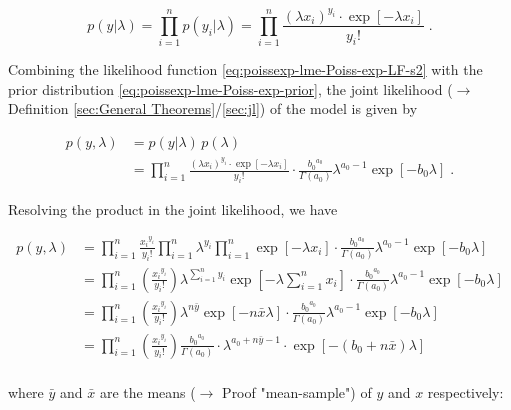 \documentclass[a4paper,12pt,twoside]{book}
\begin{document}
\begin{equation} \label{eq:poissexp-lme-Poiss-exp-LF-s2}
p(y|\lambda) = \prod_{i=1}^n p(y_i|\lambda) = \prod_{i=1}^n \frac{(\lambda x_i)^{y_i} \cdot \exp\left[-\lambda x_i\right]}{y_i !} \; .
\end{equation}

Combining the likelihood function \eqref{eq:poissexp-lme-Poiss-exp-LF-s2} with the prior distribution \eqref{eq:poissexp-lme-Poiss-exp-prior}, the joint likelihood ($\rightarrow$ Definition \ref{sec:General Theorems}/\ref{sec:jl}) of the model is given by

\begin{equation} \label{eq:poissexp-lme-Poiss-exp-JL-s1}
\begin{split}
p(y,\lambda) &= p(y|\lambda) \, p(\lambda) \\
&= \prod_{i=1}^n \frac{(\lambda x_i)^{y_i} \cdot \exp\left[-\lambda x_i\right]}{y_i !} \cdot \frac{ {b_0}^{a_0}}{\Gamma(a_0)} \lambda^{a_0-1} \exp[-b_0 \lambda] \; .
\end{split}
\end{equation}

Resolving the product in the joint likelihood, we have

\begin{equation} \label{eq:poissexp-lme-Poiss-exp-JL-s2}
\begin{split}
p(y,\lambda) &= \prod_{i=1}^n \frac{ {x_i}^{y_i}}{y_i !} \prod_{i=1}^n \lambda^{y_i} \prod_{i=1}^n \exp\left[-\lambda x_i\right] \cdot \frac{ {b_0}^{a_0}}{\Gamma(a_0)} \lambda^{a_0-1} \exp[-b_0 \lambda] \\
&= \prod_{i=1}^n \left(\frac{ {x_i}^{y_i}}{y_i !}\right) \lambda^{\sum_{i=1}^n y_i} \exp\left[-\lambda \sum_{i=1}^n x_i\right] \cdot \frac{ {b_0}^{a_0}}{\Gamma(a_0)} \lambda^{a_0-1} \exp[-b_0 \lambda] \\
&= \prod_{i=1}^n \left(\frac{ {x_i}^{y_i}}{y_i !}\right) \lambda^{n \bar{y}} \exp\left[-n \bar{x} \lambda\right] \cdot \frac{ {b_0}^{a_0}}{\Gamma(a_0)} \lambda^{a_0-1} \exp[-b_0 \lambda] \\
&= \prod_{i=1}^n \left(\frac{ {x_i}^{y_i}}{y_i !}\right) \frac{ {b_0}^{a_0}}{\Gamma(a_0)}  \cdot \lambda^{a_0 + n \bar{y} - 1} \cdot \exp\left[-(b_0 + n \bar{x}) \lambda\right] \\
\end{split}
\end{equation}

where $\bar{y}$ and $\bar{x}$ are the means ($\rightarrow$ Proof "mean-sample") of $y$ and $x$ respectively:
\end{document}
